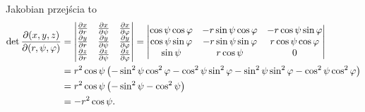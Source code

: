 Jakobian przejścia to
\begin{align*}
    \det \frac{\p (x, y, z)}{\p (r, \psi, \varphi)} &= \begin{vmatrix}
        \frac{\p x}{\p r} & \frac{\p x}{\p \psi} & \frac{\p x}{\p \varphi} \\
        \frac{\p y}{\p r} & \frac{\p y}{\p \psi} & \frac{\p y}{\p \varphi} \\
        \frac{\p z}{\p r} & \frac{\p z}{\p \psi} & \frac{\p z}{\p \varphi}
    \end{vmatrix} = \begin{vmatrix}
        \cos\psi \cos\varphi & -r \sin\psi \cos\varphi & -r \cos\psi \sin\varphi \\
        \cos\psi \sin\varphi & -r \sin\psi \sin\varphi & r \cos\psi \cos\varphi \\
        \sin\psi & r \cos\psi & 0
    \end{vmatrix} \\
    &= r^2\cos\psi\left(-\sin^2\psi\cos^2\varphi - \cos^2\psi\sin^2\varphi - \sin^2\psi\sin^2\varphi - \cos^2\psi\cos^2\varphi\right) \\
    &= r^2\cos\psi\left(-\sin^2\psi - \cos^2\psi\right) \\
    &= -r^2\cos\psi.
\end{align*}
